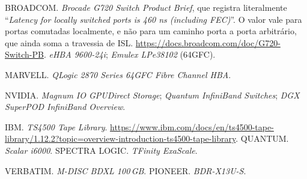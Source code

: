 \documentclass[11pt,a4paper]{article}
\begin{document}
\begin{enumerate}[label={[\arabic*]},leftmargin=*,start=17]
\item BROADCOM. \emph{Brocade G720 Switch Product Brief}, que registra literalmente
      ``\emph{Latency for locally switched ports is 460 ns (including FEC)}''. O valor vale para
      portas comutadas localmente, e não para um caminho porta a porta arbitrário, que ainda soma a
      travessia de ISL. \url{https://docs.broadcom.com/doc/G720-Switch-PB}. \emph{eHBA 9600-24i};
      \emph{Emulex LPe38102} (64GFC).
\item MARVELL. \emph{QLogic 2870 Series 64GFC Fibre Channel HBA}.
\item NVIDIA. \emph{Magnum IO GPUDirect Storage}; \emph{Quantum InfiniBand Switches};
      \emph{DGX SuperPOD InfiniBand Overview}.
\item IBM. \emph{TS4500 Tape Library}.
      \url{https://www.ibm.com/docs/en/ts4500-tape-library/1.12.2?topic=overview-introduction-ts4500-tape-library}.
      QUANTUM. \emph{Scalar i6000}.
      SPECTRA LOGIC. \emph{TFinity ExaScale}.
\item VERBATIM. \emph{M-DISC BDXL 100\,GB}. PIONEER. \emph{BDR-X13U-S}.
\end{enumerate}
\end{document}
